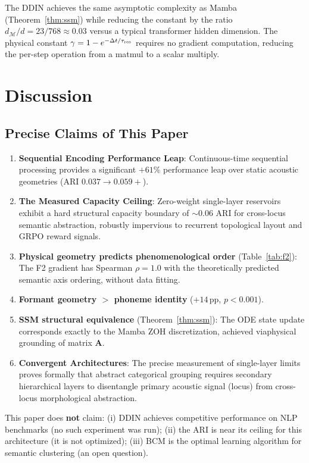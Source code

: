 \documentclass{article}
\begin{document}
The DDIN achieves the same asymptotic complexity as Mamba (Theorem~\ref{thm:ssm}) while reducing the constant by the ratio $d_\mathcal{M}/d = 23/768 \approx 0.03$ versus a typical transformer hidden dimension. The physical constant $\gamma = 1 - e^{-\Delta t/\tau_{\rm res}}$ requires no gradient computation, reducing the per-step operation from a matmul to a scalar multiply.

\section{Discussion}

\subsection{Precise Claims of This Paper}

\begin{enumerate}
  \item \textbf{Sequential Encoding Performance Leap}: Continuous-time sequential processing provides a significant $+61\%$ performance leap over static acoustic geometries (ARI $0.037 \to 0.059+$). 
  \item \textbf{The Measured Capacity Ceiling}: Zero-weight single-layer reservoirs exhibit a hard structural capacity boundary of $\sim0.06$ ARI for cross-locus semantic abstraction, robustly impervious to recurrent topological layout and GRPO reward signals.
  \item \textbf{Physical geometry predicts phenomenological order} (Table~\ref{tab:f2}): The F2 gradient has Spearman $\rho = 1.0$ with the theoretically predicted semantic axis ordering, without data fitting.
  \item \textbf{Formant geometry $>$ phoneme identity} ($+14$\,pp, $p < 0.001$).
  \item \textbf{SSM structural equivalence} (Theorem~\ref{thm:ssm}): The ODE state update corresponds exactly to the Mamba ZOH discretization, achieved viaphysical grounding of matrix $\mathbf{A}$.
  \item \textbf{Convergent Architectures}: The precise measurement of single-layer limits proves formally that abstract categorical grouping requires secondary hierarchical layers to disentangle primary acoustic signal (locus) from cross-locus morphological abstraction.
\end{enumerate}

This paper does \textbf{not} claim: (i) DDIN achieves competitive performance on NLP benchmarks (no such experiment was run); (ii) the ARI is near its ceiling for this architecture (it is not optimized); (iii) BCM is the optimal learning algorithm for semantic clustering (an open question).
\end{document}
